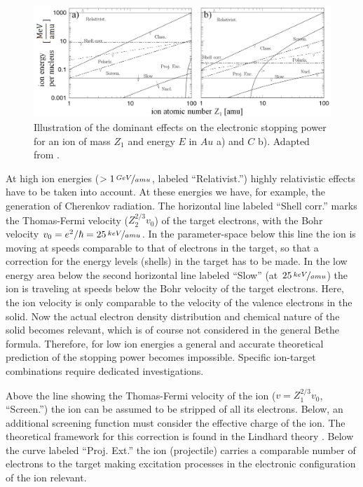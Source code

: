 \begin{figure}[h]
	\centering
		\includegraphics[width=.99\textwidth]{images/StoppinginAuandC.png}
	\caption{Illustration of the dominant effects on the electronic stopping power for an ion of mass $Z_1$ and energy $E$ in $Au$ a) and $C$ b). Adapted from \cite{sigmund_stopping_2004}.} 
	\label{stopping}
\end{figure} 


At high ion energies ($ > 1\,\nicefrac{GeV}{amu}$, labeled ``Relativist.'') highly relativistic effects have to be taken into account. At these energies we have, for example, the generation of Cherenkov radiation. The horizontal line labeled ``Shell corr.'' marks the Thomas-Fermi velocity ($Z_2^{2/3}v_0$) of the target electrons, with the Bohr velocity $v_0 = e^2/\hbar = 25\,\nicefrac{keV}{amu}$. In the parameter-space below this line the ion is moving at speeds comparable to that of electrons in the target, so that a correction for the energy levels (shells) in the target has to be made. In the low energy area below the second horizontal line labeled ``Slow'' (at $25\,\nicefrac{keV}{amu}$) the ion is traveling at speeds below the Bohr velocity of the target electrons. Here, the ion velocity is only comparable to the velocity of the valence electrons in the solid. Now the actual electron density distribution and chemical nature of the solid becomes relevant, which is of course not considered in the general Bethe formula. Therefore, for low ion energies a general and accurate theoretical prediction of the stopping power becomes impossible. Specific ion-target combinations require dedicated investigations.

Above the line showing the Thomas-Fermi velocity of the ion ($v = Z_1^{2/3}v_0$, ``Screen.'') the ion can be assumed to be stripped of all its electrons. Below, an additional screening function must consider the effective charge of the ion. The theoretical framework for this correction is found in the Lindhard theory \cite{lindhard_properties_1954}. Below the curve labeled ``Proj. Ext.'' the ion (projectile) carries a comparable number of electrons to the target making excitation processes in the electronic configuration of the ion relevant.

